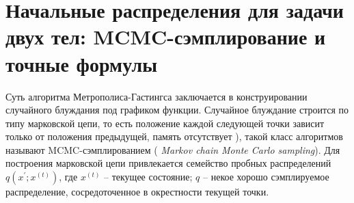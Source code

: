 \documentclass[12pt]{article}
\newcommand{\lb}{\left(}
\newcommand{\rb}{\right)}
\begin{document}
\section{Начальные распределения для задачи двух тел: MCMC-сэмплирование и точные формулы}

Суть алгоритма Метрополиса-Гастингса заключается в конструировании случайного блуждания под графиком функции. Случайное блуждание строится по типу марковской цепи, то есть положение каждой следующей точки зависит только от положения предыдущей, память отсутствует ), такой класс алгоритмов называют MCMC-сэмплированием ( \textit{Markov chain Monte Carlo sampling}). Для построения марковской цепи привлекается семейство пробных распределений $ q( x^\prime; x^{\lb t \rb} )$, где $x^{\lb t \rb}$ -- текущее состояние; $q$ -- некое хорошо сэмплируемое распределение, сосредоточенное в окрестности текущей точки.  
\end{document}
